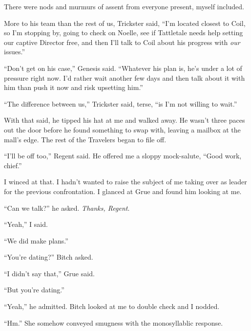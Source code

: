 There were nods and murmurs of assent from everyone present, myself included.



More to his team than the rest of us, Trickster said, ``I'm located closest to Coil, so I'm stopping by, going to check on Noelle, see if Tattletale needs help setting our captive Director free, and then I'll talk to Coil about his progress with \emph{our} issues.''



``Don't get on his case,'' Genesis said.  ``Whatever his plan is, he's under a lot of pressure right now.  I'd rather wait another few days and then talk about it with him than push it now and risk upsetting him.''



``The difference between us,'' Trickster said, terse, ``is I'm not willing to wait.''



With that said, he tipped his hat at me and walked away.  He wasn't three paces out the door before he found something to swap with, leaving a mailbox at the mall's edge.  The rest of the Travelers began to file off.



``I'll be off too,'' Regent said.  He offered me a sloppy mock-salute, ``Good work, chief.''



I winced at that.  I hadn't wanted to raise the subject of me taking over as leader for the previous confrontation.  I glanced at Grue and found him looking at me.



``Can we talk?'' he asked.  \emph{Thanks, Regent}.



``Yeah,'' I said.



``We did make plans.''



``You're dating?''  Bitch asked.



``I didn't say that,'' Grue said.



``But you're dating.''



``Yeah,'' he admitted.  Bitch looked at me to double check and I nodded.



``Hm.''  She somehow conveyed smugness with the monosyllablic response.



